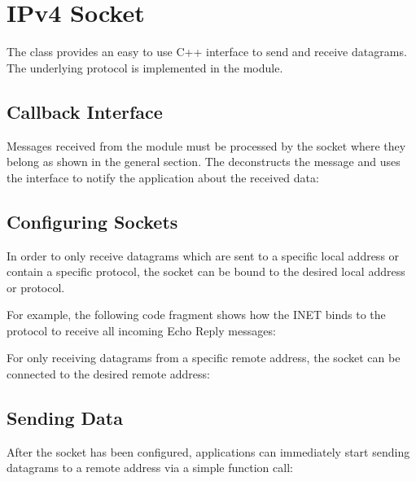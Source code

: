 
\section{IPv4 Socket}
\label{sec:sockets:ipv4-socket}

The  class provides an easy to use C++ interface to send
and receive  datagrams. The underlying  protocol
is implemented in the  module.

\subsection*{Callback Interface}

Messages received from the  module must be processed by the socket
where they belong as shown in the general section. The 
deconstructs the message and uses the  interface
to notify the application about the received data:


\subsection*{Configuring Sockets}

In order to only receive  datagrams which are sent to a specific
local address or contain a specific protocol, the socket can be bound to the
desired local address or protocol.

For example, the following code fragment shows how the INET 
binds to the  protocol to receive all incoming
 Echo Reply messages:


For only receiving  datagrams from a specific remote address, the
socket can be connected to the desired remote address:


\subsection*{Sending Data}

After the socket has been configured, applications can immediately start sending
 datagrams to a remote address via a simple function call:

